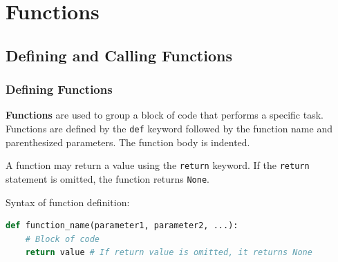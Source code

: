 \documentclass[beamer, en, version=2.0]{huangfusl-template}
\begin{document}
    \section{Functions}
    \subsection{Defining and Calling Functions}
    \begin{frame}[fragile]
        \frametitle{Defining Functions}

        \textbf{Functions} are used to group a block of code that performs a specific task. Functions are defined by the {\footnotesize\verb|def|} keyword followed by the function name and parenthesized parameters. The function body is indented.

        A function may return a value using the {\scriptsize\verb|return|} keyword. If the {\scriptsize\verb|return|} statement is omitted, the function returns {\footnotesize\verb|None|}.

        Syntax of function definition:

\begin{lstlisting}[language=python]
def function_name(parameter1, parameter2, ...):
    # Block of code
    return value # If return value is omitted, it returns None
\end{lstlisting}
    \end{frame}
\end{document}
